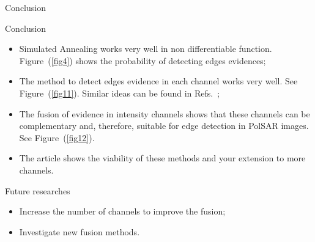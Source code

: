 \documentclass[10pt]{beamer}
\begin{document}
\begin{frame}[fragile]{Conclusion}
\begin{alertblock}{Conclusion}
\begin{itemize}
	\item Simulated Annealing works very well in non differentiable function. Figure~(\ref{fig4}) shows the probability of detecting edges evidences;
	\item The method to detect edges evidence in each channel works very well. See Figure~(\ref{fig11}). Similar ideas can be found in  Refs.~\cite{fbgm,nhfc};
	\item The fusion of evidence in intensity channels shows that these channels can be complementary and, therefore, suitable for edge detection in PolSAR images. See Figure~(\ref{fig12}).
	\item The article shows the viability of these methods and your extension to more channels.
\end{itemize}
\end{alertblock}
\begin{alertblock}{Future researches}	
\begin{itemize}
	\item Increase the number of channels to improve the fusion;
	\item Investigate new fusion methods.
\end{itemize}
\end{alertblock}
\end{frame}

\begin{frame}[allowframebreaks]


\end{frame}
\end{document}
